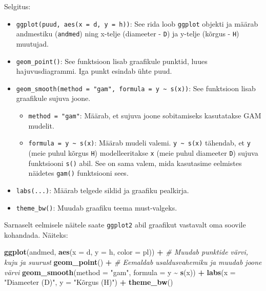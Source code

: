 \documentclass[
]{book}
\newenvironment{Shaded}{\begin{snugshade}}{\end{snugshade}}
\newcommand{\AttributeTok}[1]{\textcolor[rgb]{0.13,0.29,0.53}{#1}}
\newcommand{\CommentTok}[1]{\textcolor[rgb]{0.56,0.35,0.01}{\textit{#1}}}
\newcommand{\FunctionTok}[1]{\textcolor[rgb]{0.13,0.29,0.53}{\textbf{#1}}}
\newcommand{\NormalTok}[1]{#1}
\newcommand{\SpecialCharTok}[1]{\textcolor[rgb]{0.81,0.36,0.00}{\textbf{#1}}}
\newcommand{\StringTok}[1]{\textcolor[rgb]{0.31,0.60,0.02}{#1}}
\providecommand{\tightlist}{%
  \setlength{\itemsep}{0pt}\setlength{\parskip}{0pt}}
\renewenvironment{Shaded} {\begin{snugshade}\footnotesize} {\end{snugshade}}
\begin{document}
Selgitus:

\begin{itemize}
\tightlist
\item
  \texttt{ggplot(puud,\ aes(x\ =\ d,\ y\ =\ h))}: See rida loob \texttt{ggplot} objekti ja määrab andmestiku (\texttt{andmed}) ning x-telje (diameeter - \texttt{D}) ja y-telje (kõrgus - \texttt{H}) muutujad.
\item
  \texttt{geom\_point()}: See funktsioon lisab graafikule punktid, luues hajuvusdiagrammi. Iga punkt esindab ühte puud.
\item
  \texttt{geom\_smooth(method\ =\ "gam",\ formula\ =\ y\ \textasciitilde{}\ s(x))}: See funktsioon lisab graafikule sujuva joone.

  \begin{itemize}
  \tightlist
  \item
    \texttt{method\ =\ "gam"}: Määrab, et sujuva joone sobitamiseks kasutatakse GAM mudelit.
  \item
    \texttt{formula\ =\ y\ \textasciitilde{}\ s(x)}: Määrab mudeli valemi. \texttt{y\ \textasciitilde{}\ s(x)} tähendab, et \texttt{y} (meie puhul kõrgus \texttt{H}) modelleeritakse \texttt{x} (meie puhul diameeter \texttt{D}) sujuva funktsiooni \texttt{s()} abil. See on sama valem, mida kasutasime eelmistes näidetes \texttt{gam()} funktsiooni sees.
  \end{itemize}
\item
  \texttt{labs(...)}: Määrab telgede sildid ja graafiku pealkirja.
\item
  \texttt{theme\_bw()}: Muudab graafiku teema must-valgeks.
\end{itemize}

Sarnaselt eelmisele näitele saate \texttt{ggplot2} abil graafikut vastavalt oma soovile kohandada. Näiteks:

\begin{Shaded}
\begin{Highlighting}[]
\FunctionTok{ggplot}\NormalTok{(andmed, }\FunctionTok{aes}\NormalTok{(}\AttributeTok{x =}\NormalTok{ d, }\AttributeTok{y =}\NormalTok{ h, }\AttributeTok{color =}\NormalTok{ pl)) }\SpecialCharTok{+}
  \CommentTok{\# Muudab punktide värvi, kuju ja suurust}
  \FunctionTok{geom\_point}\NormalTok{() }\SpecialCharTok{+}  
  \CommentTok{\# Eemaldab usaldusvahemiku ja muudab joone värvi}
  \FunctionTok{geom\_smooth}\NormalTok{(}\AttributeTok{method =} \StringTok{"gam"}\NormalTok{, }\AttributeTok{formula =}\NormalTok{ y }\SpecialCharTok{\textasciitilde{}} \FunctionTok{s}\NormalTok{(x)) }\SpecialCharTok{+}  
  \FunctionTok{labs}\NormalTok{(}\AttributeTok{x =} \StringTok{"Diameeter (D)"}\NormalTok{, }\AttributeTok{y =} \StringTok{"Kõrgus (H)"}\NormalTok{) }\SpecialCharTok{+}
  \FunctionTok{theme\_bw}\NormalTok{()}
\end{Highlighting}
\end{Shaded}
\end{document}
